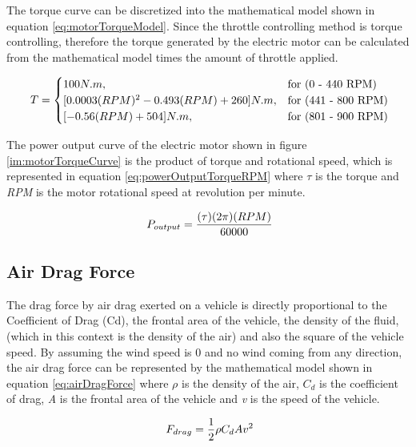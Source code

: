 The torque curve can be discretized into the mathematical model shown in equation \ref{eq:motorTorqueModel}. Since the throttle controlling method is torque controlling, therefore the torque generated by the electric motor can be calculated from the mathematical model times the amount of throttle applied.

\begin{equation} [htb]
	\label{eq:motorTorqueModel}
	\text{\myequations{Mathematical model for the torque of the electric motor}}
	T = \begin{cases} 100 N.m, & \mbox{for (0 - 440 RPM)} \\ [0.0003(RPM)^2 - 0.493(RPM) + 260] N.m, & \mbox{for (441 - 800 RPM)} \\ [-0.56(RPM) + 504] N.m, & \mbox{for (801 - 900 RPM)} \end{cases}
\end{equation}

The power output curve of the electric motor shown in figure \ref{im:motorTorqueCurve} is the product of torque and rotational speed, which is represented in equation \ref{eq:powerOutputTorqueRPM} where \textit{$\tau$} is the torque and \textit{RPM} is the motor rotational speed at revolution per minute.

\begin{equation}
	\label{eq:powerOutputTorqueRPM}
	\text{\myequations{Relationship between power output, torque and rotational speed}}
	P_{output} = \frac{(\tau)(2\pi)(RPM)}{60000}
\end{equation}

\subsection{Air Drag Force}
The drag force by air drag exerted on a vehicle is directly proportional to the Coefficient of Drag (Cd), the frontal area of the vehicle, the density of the fluid, (which in this context is the density of the air) and also the square of the vehicle speed. By assuming the wind speed is 0 and no wind coming from any direction, the air drag force can be represented by the mathematical model shown in equation \ref{eq:airDragForce} where \textit{$\rho$} is the density of the air, \textit{$C_{d}$} is the coefficient of drag, \textit{A} is the frontal area of the vehicle and \textit{v} is the speed of the vehicle.

\begin{equation}
	\label{eq:airDragForce}
	\text{\myequations{Air drag force}}
	F_{drag} = \frac{1}{2}\rho C_{d} A v^2
\end{equation}

